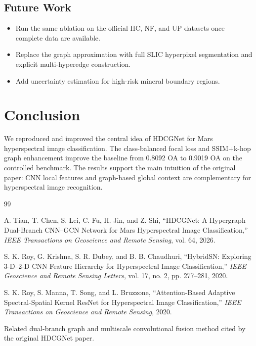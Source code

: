 \documentclass[conference]{IEEEtran}
\begin{document}
\subsection{Future Work}
\begin{itemize}
    \item Run the same ablation on the official HC, NF, and UP datasets once complete data are available.
    \item Replace the graph approximation with full SLIC hyperpixel segmentation and explicit multi-hyperedge construction.
    \item Add uncertainty estimation for high-risk mineral boundary regions.
\end{itemize}

\section{Conclusion}
We reproduced and improved the central idea of HDCGNet for Mars hyperspectral image classification. The class-balanced focal loss and SSIM+k-hop graph enhancement improve the baseline from 0.8092 OA to 0.9019 OA on the controlled benchmark. The results support the main intuition of the original paper: CNN local features and graph-based global context are complementary for hyperspectral image recognition.

\begin{thebibliography}{99}

A. Tian, T. Chen, S. Lei, C. Fu, H. Jin, and Z. Shi,
``HDCGNet: A Hypergraph Dual-Branch CNN--GCN Network for Mars Hyperspectral Image Classification,''
\textit{IEEE Transactions on Geoscience and Remote Sensing}, vol. 64, 2026.

S. K. Roy, G. Krishna, S. R. Dubey, and B. B. Chaudhuri,
``HybridSN: Exploring 3-D--2-D CNN Feature Hierarchy for Hyperspectral Image Classification,''
\textit{IEEE Geoscience and Remote Sensing Letters}, vol. 17, no. 2, pp. 277--281, 2020.

S. K. Roy, S. Manna, T. Song, and L. Bruzzone,
``Attention-Based Adaptive Spectral-Spatial Kernel ResNet for Hyperspectral Image Classification,''
\textit{IEEE Transactions on Geoscience and Remote Sensing}, 2020.

Related dual-branch graph and multiscale convolutional fusion method cited by the original HDCGNet paper.

\end{thebibliography}
\end{document}
